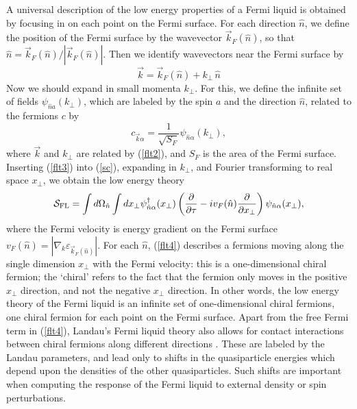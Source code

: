 \documentclass[10pt, oneside]{book}
\begin{document}
\begin{doublespace}
A universal description of the low energy properties of a Fermi liquid is obtained by focusing in on each point
on the Fermi surface.
For each direction $\hat{n}$, we define the position
of the Fermi surface by the wavevector $\vec{k}_F (\hat{n})$, so that $\hat{n} = \vec{k}_F (\hat{n}) / | \vec{k}_F (\hat{n}) |$.
Then we identify wavevectors near the Fermi surface by
\begin{equation}
\vec{k} = \vec{k}_F ( \hat{n}) + k_\perp \, \hat{n} \label{flt2}
\end{equation}
Now we should expand in small momenta $k_\perp$.  For this, we define the infinite set of fields $\psi_{\hat{n} a} (k_\perp)$,
which are labeled by the spin $a$ and the direction $\hat{n}$, related to the fermions $c$ by
\begin{equation}
c_{\vec{k}\alpha} = \frac{1}{\sqrt{S_F}}\psi_{\hat{n} \alpha} (k_\perp), \label{flt3}
\end{equation}
where $\vec{k}$ and $k_\perp$ are related by (\ref{flt2}), and $S_F$ is the area of the Fermi surface. 
Inserting
(\ref{flt3}) into (\ref{sc}), expanding in $k_\perp$, and Fourier transforming to real space $x_\perp$, we obtain
the low energy theory
\begin{equation}
\mathcal{S}_{\rm FL} = \int d \Omega_{\hat{n}} \int d x_\perp \psi_{\hat{n} \alpha}^\dagger ( x_\perp ) \left( 
\frac{\partial}{\partial \tau} - i v_F (\hat{n}) \frac{\partial}{\partial x_\perp} \right) \psi_{\hat{n} \alpha} ( x_\perp ),
\label{flt4}
\end{equation}
where the Fermi velocity is energy gradient on the Fermi surface 
$v_F (\hat{n}) = | \nabla_k \varepsilon_{\vec{k}_F (\hat{n})} |$.
For each $\hat{n}$, (\ref{flt4}) describes a fermions moving along the single dimension $x_\perp$ with the
Fermi velocity: this is a one-dimensional chiral fermion; the
`chiral' refers to the fact that the fermion only moves in the positive $x_\perp$ direction, and not 
the negative $x_\perp$ direction.
In other words, the low energy theory of the Fermi liquid is an infinite set of one-dimensional
chiral fermions, one chiral fermion for each point on the Fermi surface.
Apart from the free Fermi term in (\ref{flt4}), Landau's Fermi liquid theory also allows for
contact interactions between chiral fermions along different directions \cite{shankarrg}.
These are labeled by the Landau parameters, and lead only to shifts in the quasiparticle
energies which depend upon the densities of the other quasiparticles. Such shifts are important
when computing the response of the Fermi liquid to external density or spin perturbations.


\end{doublespace}
\end{document}
